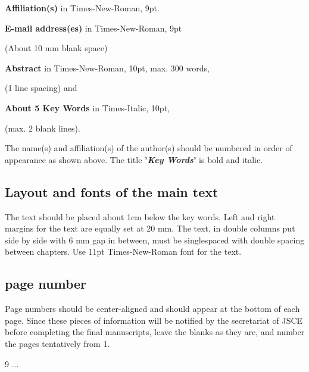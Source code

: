 \documentclass[english]{jjsce}
\begin{document}
\textbf{Affiliation(s)} in Times-New-Roman, 9pt.

\textbf{E-mail address(es)} in Times-New-Roman, 9pt

\hspace*{40pt} (About 10 mm blank space)

\textbf{Abstract} in Times-New-Roman, 10pt, max. 300 words,

\hspace*{40pt} (1 line spacing) and

\textbf{About 5 Key Words} in Times-Italic, 10pt,

\hspace*{40pt} (max. 2 blank lines).

The name(s) and affiliation(s) of the author(s)
should be numbered in order of appearance as shown
above. The title \textbf{'\textit{Key Words}'} is bold and italic. 

\subsection{Layout and fonts of the main text}

The text should be placed about 1cm below the key words.
Left and right margins for the text are equally set at 20 mm.
The text, in double columns put side by
side with 6 mm gap in between, must be singlespaced with
 double spacing between chapters. 
Use 11pt Times-New-Roman font for the text. 

\subsection{page number}

Page numbers should be center-aligned and should
appear at the bottom of each page. 
Since these pieces of information will be notified by the secretariat of
JSCE before completing the final manuscripts, leave
the blanks as they are, and number the pages tentatively from 1. 



\begin{thebibliography}{9}
...
\end{thebibliography}
\end{document}
